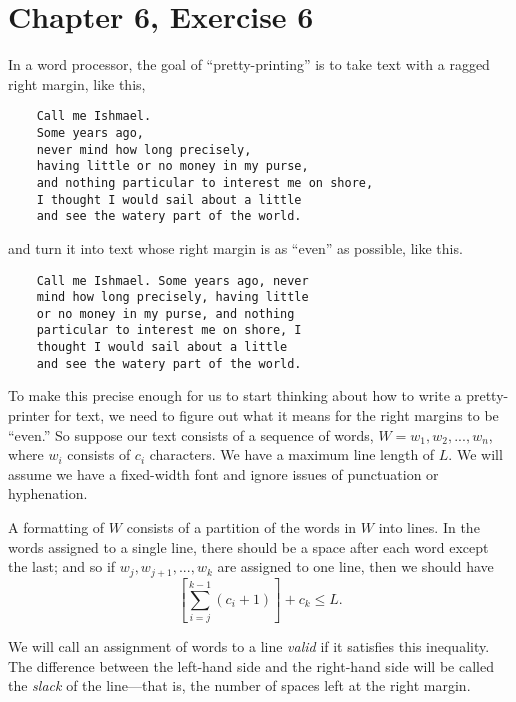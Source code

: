 \documentclass[12pt, letterpaper]{article}
\title{\ptitle{}}
\author{\pauthor{}}
\begin{document}
\maketitle

\section{Chapter 6, Exercise 6}
In a word processor, the goal of ``pretty-printing'' is to take text with a ragged right margin, like this,
\begin{verbatim}
    Call me Ishmael.
    Some years ago,
    never mind how long precisely,
    having little or no money in my purse,
    and nothing particular to interest me on shore,
    I thought I would sail about a little
    and see the watery part of the world.
\end{verbatim}
and turn it into text whose right margin is as ``even'' as possible, like this.
\begin{verbatim}
    Call me Ishmael. Some years ago, never
    mind how long precisely, having little
    or no money in my purse, and nothing
    particular to interest me on shore, I
    thought I would sail about a little
    and see the watery part of the world.
\end{verbatim}

To make this precise enough for us to start thinking about how to write a pretty-printer for text, we need to figure out what it means for the right margins to be ``even.'' 
So suppose our text consists of a sequence of words, $W = { w_1, w_2, ..., w_n }$, where $w_i$ consists of $c_i$ characters. 
We have a maximum line length of $L$. 
We will assume we have a fixed-width font and ignore issues of punctuation or hyphenation.

A formatting of $W$ consists of a partition of the words in $W$ into lines. 
In the words assigned to a single line, there should be a space after each word except the last; and so if $w_j, w_{j+1}, ..., w_k$ are assigned to one line, then we should have
\begin{equation*}
    \left[ \sum_{i=j}^{k-1}{(c_i+1)} \right] + c_k \leq L .
\end{equation*}

We will call an assignment of words to a line \textit{valid} if it satisfies this inequality. 
The difference between the left-hand side and the right-hand side will be called the \textit{slack} of the line—that is, the number of spaces left at the right margin.
\end{document}
